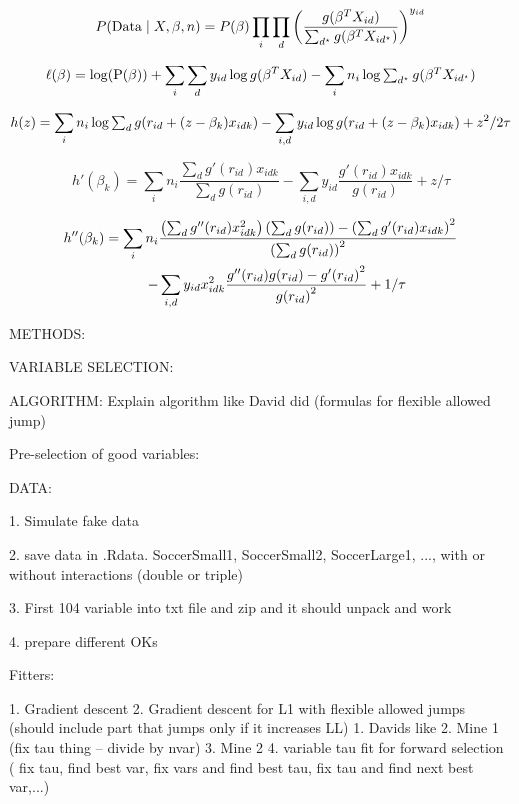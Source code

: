\documentclass[12pt, letter]{article}
\begin{document}
$$P(\mathrm{Data}\mid X, \beta, n) = P(\beta) \prod_i \prod_d
    \zag{\frac{g(\beta^T X_{id})}{\sum_{d^\star}g(\beta^T X_{id^\star})}}^{y_{id}}$$


$$\ell(\beta) = \log(\mathrm{P(\beta)}) + \sum_i \sum_d y_{id}\log{g(\beta^T X_{id})} -
    \sum_i n_i \log {\TS\sum_{d^\star}{g(\beta^T X_{id^\star})}}$$

$$h(z) = \sum_i n_i \log {\TS\sum_{d}{g(r_{id} + (z-\beta_k) x_{idk})}} -
    \sum_{i,d} y_{id}\log{g(r_{id} + (z-\beta_k) x_{idk})} + z^2/2\tau$$

$$h'(\beta_k) = \sum_i n_i \frac{\sum_{d}g'(r_{id})x_{idk}}{\sum_{d} g(r_{id})} -
    \sum_{i,d} y_{id}\frac{g'(r_{id})x_{idk}}{ g(r_{id})} + z/\tau$$

\begin{equation*}
\begin{split}
h''(\beta_k) = \sum_i n_i& \frac{\zag{\sum_{d}g''(r_{id})x_{idk}^2}\zag{\sum_{d}g(r_{id})} - \zag{\sum_{d}g'(r_{id})x_{idk}}^2 }{\zag{\sum_{d} g(r_{id})}^2} \\ -&
\sum_{i,d} y_{id}x_{idk}^2\frac{g''(r_{id})g(r_{id})- {g'(r_{id})}^2}{{g(r_{id})}^2} + 1/\tau
\end{split}
\end{equation*}



\newpage


%

METHODS:

VARIABLE SELECTION:

ALGORITHM:
Explain algorithm like David did (formulas for flexible allowed jump)

Pre-selection of good variables:


DATA:

1. Simulate fake data

2. save data in .Rdata. SoccerSmall1, SoccerSmall2, SoccerLarge1, ..., with or without interactions (double or triple)

3. First 104 variable into txt file and zip and it should  unpack and work

4. prepare different OKs


Fitters:

1. Gradient descent
2. Gradient descent for L1 with flexible allowed jumps (should include part that jumps only if it increases LL)
1. Davids like
2. Mine 1 (fix tau thing -- divide by nvar)
3. Mine 2
4. variable tau fit for forward selection (
fix tau, find best var, fix vars and find best tau, fix tau and find next best var,...)
\end{document}
